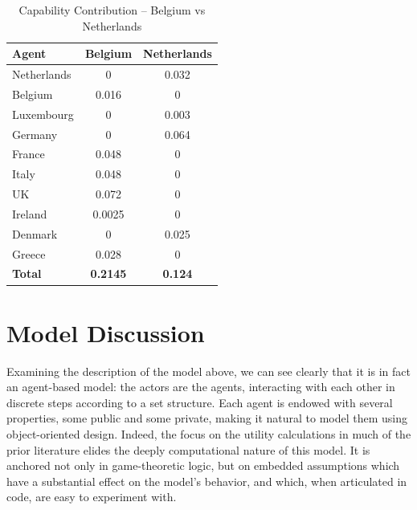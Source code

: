 \begin{table}[h!]
\centering
    \caption{Capability Contribution -- Belgium vs Netherlands}
    \label{table:contributions}
\begin{tabular}{lcc}
    \hline
    Agent &  Belgium & Netherlands \\
    \hline
    Netherlands & 0 & 0.032 \\
    Belgium & 0.016 & 0 \\
    Luxembourg & 0 & 0.003 \\
    Germany & 0 & 0.064 \\
    France & 0.048 & 0 \\
    Italy & 0.048 & 0 \\
    UK & 0.072 & 0 \\
    Ireland & 0.0025 & 0 \\
    Denmark & 0 & 0.025 \\
    Greece & 0.028 & 0 \\
    \textbf{Total} & \textbf{0.2145} & \textbf{0.124} \\
    \hline
\end{tabular}
\tableSpace

\end{table}


\section{Model Discussion} \label{bdm_discussion}

Examining the description of the model above, we can see clearly that it is in fact an agent-based model: the actors are the agents, interacting with each other in discrete steps according to a set structure. Each agent is endowed with several properties, some public and some private, making it natural to model them using object-oriented design. Indeed, the focus on the utility calculations in much of the prior literature elides the deeply computational nature of this model. It is anchored not only in game-theoretic logic, but on embedded assumptions which have a substantial effect on the model's behavior, and which, when articulated in code, are easy to experiment with. 


